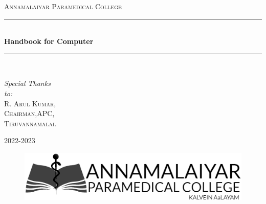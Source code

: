 \documentclass[11pt,a4paper,twoside]{article}
\begin{document}
\begin{titlepage}
\newcommand{\HRule}{\rule{\linewidth}{0.5mm}}
\center 
\textsc{\LARGE Annamalaiyar Paramedical College}\\[1.5cm] %
\HRule \\[0.4cm]
{ \huge \bfseries Handbook for Computer}\\[0.4cm] %
\HRule \\[5cm]
\begin{flushright} \large
\emph{Special Thanks\\ to:} \\
R. \textsc{Arul Kumar,\\Chairman,APC,\\Tiruvannamalai.}
\end{flushright}
\vspace{12cm}
{\large 2022-2023}\\
\begin{figure}
\centering
\includegraphics[scale=0.9]{logo.png}
\end{figure}
\vfill
\end{titlepage}
\tableofcontents
\newpage
\end{document}
